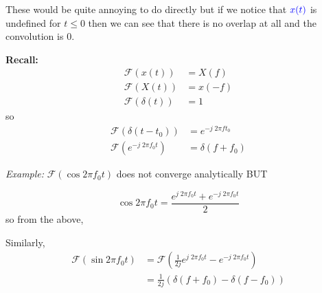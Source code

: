 \documentclass[12pt]{report}
\newcommand{\F}{\mathcal{F}}
\newenvironment*{proposition}[1][gray]{
    \begin{tcolorbox}[
        parbox=false,
        colback=#1!5!white,
        colframe=#1!75!black,
        breakable
    ]}
    {\end{tcolorbox}}
\begin{document}
These would be quite annoying to do directly but if we notice that $\textcolor{blue}{x(t)}$ is undefined for $t \leq 0$ then we can see that there is no overlap at all and the convolution is 0.

\begin{proposition}
    \textbf{Recall:} 
    \begin{align*}
        \F(x(t)) &= X(f)\\ 
        \F(X(t)) &= x(-f)\\ 
        \F(\delta(t)) &= 1
    \end{align*}
    so 
    \begin{align*}
        \F(\delta(t- t_0)) &= e^{-j\; 2\pi ft_0}\\ 
        \F(e^{-j\; 2\pi f_0t}) &= \delta(f+ f_0)
    \end{align*}
\end{proposition}

\emph{Example:} $\F(\cos 2\pi f_0 t)$ does not converge analytically BUT 

\[\cos 2\pi f_0 t = \frac{e^{j\; 2\pi f_0t} + e^{-j\; 2\pi f_0t}}{2}\]
so from the above, 

\begin{center}
\end{center}

Similarly, 
\begin{align*}
    \F(\sin 2\pi f_0 t) &= \F\left(\frac{1}{2j} e^{j\; 2\pi f_0t} - e^{-j\; 2\pi f_0t}\right)\\ 
    &= \frac{1}{2j}(\delta(f + f_0) - \delta(f - f_0))
\end{align*}

\begin{center}
\end{center}
\end{document}
